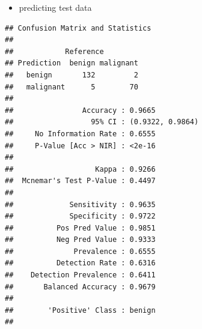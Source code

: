 \documentclass[]{article}
\newenvironment{Shaded}{\begin{snugshade}}{\end{snugshade}}
\newcommand{\KeywordTok}[1]{\textcolor[rgb]{0.13,0.29,0.53}{\textbf{{#1}}}}
\newcommand{\DataTypeTok}[1]{\textcolor[rgb]{0.13,0.29,0.53}{{#1}}}
\newcommand{\FloatTok}[1]{\textcolor[rgb]{0.00,0.00,0.81}{{#1}}}
\newcommand{\StringTok}[1]{\textcolor[rgb]{0.31,0.60,0.02}{{#1}}}
\newcommand{\OtherTok}[1]{\textcolor[rgb]{0.56,0.35,0.01}{{#1}}}
\newcommand{\NormalTok}[1]{{#1}}
\providecommand{\tightlist}{%
  \setlength{\itemsep}{0pt}\setlength{\parskip}{0pt}}
\begin{document}
\begin{itemize}
\tightlist
\item
  predicting test data
\end{itemize}

\begin{Shaded}
\end{Shaded}

\begin{verbatim}
## Confusion Matrix and Statistics
## 
##            Reference
## Prediction  benign malignant
##   benign       132         2
##   malignant      5        70
##                                           
##                Accuracy : 0.9665          
##                  95% CI : (0.9322, 0.9864)
##     No Information Rate : 0.6555          
##     P-Value [Acc > NIR] : <2e-16          
##                                           
##                   Kappa : 0.9266          
##  Mcnemar's Test P-Value : 0.4497          
##                                           
##             Sensitivity : 0.9635          
##             Specificity : 0.9722          
##          Pos Pred Value : 0.9851          
##          Neg Pred Value : 0.9333          
##              Prevalence : 0.6555          
##          Detection Rate : 0.6316          
##    Detection Prevalence : 0.6411          
##       Balanced Accuracy : 0.9679          
##                                           
##        'Positive' Class : benign          
## 
\end{verbatim}

\begin{Shaded}
\end{Shaded}
\end{document}
